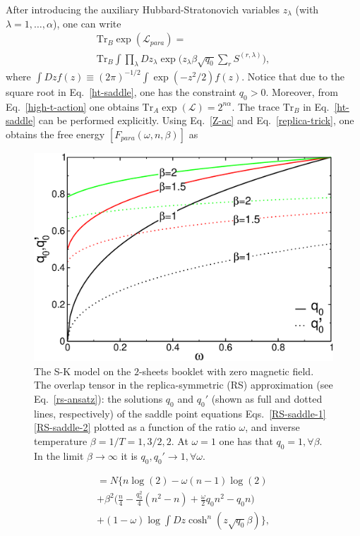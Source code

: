 \documentclass[twocolumn,superscriptaddress,prb,10pt]{revtex4-1}
\def\tr{\textrm{Tr}}
\begin{document}
%
After introducing the auxiliary Hubbard-Stratonovich variables $z_\lambda$ 
(with $\lambda=1,\dots,\alpha$), one can write 
%
\begin{multline}
\label{ht-saddle}
\textrm{Tr}_B\exp({\mathcal L}_{para})=\\\tr_B\int\prod_\lambda Dz_{\lambda}
\exp\Big(z_\lambda\beta\sqrt{q_0}\sum_r S^{(r,\lambda)}\Big),
\end{multline}
%
where $\int Dz f(z)\equiv(2\pi)^{-1/2}\int\exp(-z^2/2)f(z)$. Notice that 
due to the square root in Eq.~\eqref{ht-saddle}, one has the constraint 
$q_0>0$. Moreover, from Eq.~\eqref{high-t-action} 
one obtains $\textrm{Tr}_A\exp({\mathcal L})=2^{n\alpha}$. The trace 
$\textrm{Tr}_B$ in Eq.~\eqref{ht-saddle} can be performed explicitly. 
Using Eq.~\eqref{Z-ac} and Eq.~\eqref{replica-trick}, one obtains 
the free energy $[F_{para}(\omega,n,\beta)]$ as  
%
\begin{figure}[t]
\includegraphics*[width=0.9\linewidth]{./draft_figs/RSB0_saddle}
\caption{\label{RSB0-saddle}
 The S-K model on the $2$-sheets booklet with zero magnetic field. The 
 overlap tensor in the replica-symmetric (RS) approximation (see Eq.~\eqref{rs-ansatz}): 
 the solutions $q_0$ and $q_0'$ (shown as full and dotted lines, respectively) 
 of the saddle point equations Eqs.~\eqref{RS-saddle-1}\eqref{RS-saddle-2} 
 plotted as a function of the ratio $\omega$, and inverse temperature 
 $\beta=1/T=1,3/2,2$. At $\omega=1$ one has that $q_0=1,\forall\beta$.
 In the limit $\beta\to\infty$ it is $q_0,q_0'\to 1,\forall\omega$.
}
\label{RSB0_saddle}
\end{figure}
%
\begin{multline}
[F_{para}(\omega,n,\beta)]=N\Big\{
n\log(2)-\omega(n-1)\log(2)\\+
\beta^2\Big(\frac{n}{4}-\frac{q_0^2}{4}(n^2-n)
+\frac{\omega}{2}q_0n^2-q_0n\Big)\\
+(1-\omega)\log\int Dz\cosh^n(z\sqrt{q_0}\beta)
\Big\},
\label{ht-logZ}
\end{multline}
\end{document}
